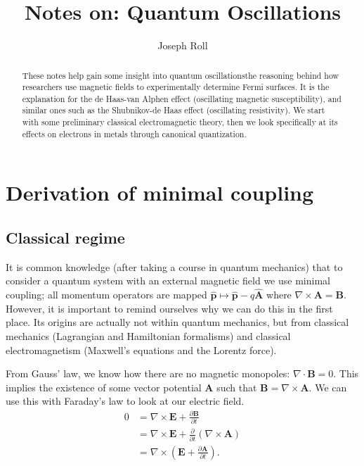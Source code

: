 \documentclass[12pt]{revtex4-2}
\begin{document}
\title{Notes on: Quantum Oscillations}
\author{Joseph Roll}

\begin{abstract}
    These notes help gain some insight into quantum oscillations\textemdash the reasoning behind how researchers use magnetic fields to experimentally determine Fermi surfaces.  It is the explanation for the de Haas-van Alphen effect (oscillating magnetic susceptibility), and similar ones such as the Shubnikov-de Haas effect (oscillating resistivity).  We start with some preliminary classical electromagnetic theory, then we look specifically at its effects on electrons in metals through canonical quantization.
\end{abstract}

\maketitle

\section{Derivation of minimal coupling}
\subsection{Classical regime}

It is common knowledge (after taking a course in quantum mechanics) that to consider a quantum system with an external magnetic field we use minimal coupling; all momentum operators are mapped $\hat{\mathbf{p}} \mapsto \hat{\mathbf{p}} - q\hat{\mathbf{A}}$ where $\nabla \times \mathbf{A} = \mathbf{B}$.  However, it is important to remind ourselves why we can do this in the first place.  Its origins are actually not within quantum mechanics, but from classical mechanics (Lagrangian and Hamiltonian formalisms) and classical electromagnetism (Maxwell's equations and the Lorentz force).
\par
From Gauss' law, we know how there are no magnetic monopoles:  $\nabla \cdot \mathbf{B} = 0$.  This implies the existence of some vector potential $\mathbf{A}$ such that $\mathbf{B} = \nabla \times \mathbf{A}$.  We can use this with Faraday's law to look at our electric field.
\begin{align}
    0 &= \nabla \times \mathbf{E} + \frac{\partial \mathbf{B}}{\partial t} \\
    &= \nabla \times \mathbf{E} + \frac{\partial}{\partial t}(\nabla \times \mathbf{A}) \\
    &= \nabla \times \left(\mathbf{E} + \frac{\partial\mathbf{A}}{\partial t} \right).
\end{align}
\end{document}
